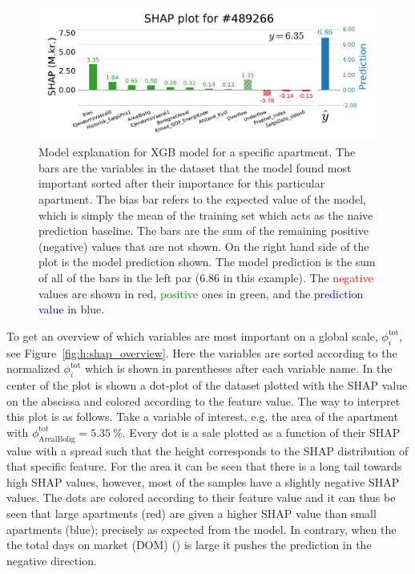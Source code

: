 \begin{figure}[ht!]
  \centerfloat
  \includegraphics[width=0.99\textwidth, trim=15 15 10 40, clip]{figures/housing/Ejerlejlighed_v19_cut_all_Ncols_all_SHAP_fig_loc=489266.pdf}
  \caption[SHAP Prediction Explanation for apartment]
          {Model explanation for XGB model for a specific apartment. The bars are the variables in the dataset that the model found most important sorted after their importance for this particular apartment. The bias bar refers to the expected value of the model, which is simply the mean of the training set which acts as the naive prediction baseline. The  bars are the sum of the remaining positive (negative) values that are not shown. On the right hand side of the plot is the model prediction shown. The model prediction is the sum of all of the bars in the left par (\SI{6.86}{\Mkr} in this example). The \textcolor{red}{negative} values are shown in red, \textcolor{green}{positive} ones in green, and the \textcolor{blue}{prediction value} in blue. 
          } 
  \label{fig:h:shap_single_apartment}
\end{figure}

To get an overview of which variables are most important on a global scale, $\phi_i^\mathrm{tot}$, see Figure~\ref{fig:h:shap_overview}. Here the variables are sorted according to the normalized $\phi_i^\mathrm{tot}$ which is shown in parentheses after each variable name. In the center of the plot is shown a dot-plot of the dataset plotted with the SHAP value on the abscissa and colored according to the feature value. 
The way to interpret this plot is as follows. Take a variable of interest, e.g. the area of the apartment  with $\phi_\mathrm{ArealBolig}^\mathrm{tot}=\SI{5.35}{\percent}$. Every dot is a sale plotted as a function of their SHAP value with a spread such that the height corresponds to the SHAP distribution of that specific feature. For the area it can be seen that there is a long tail towards high SHAP values, however, most of the samples have a slightly negative SHAP values. The dots are colored according to their feature value and it can thus be seen that large apartments (red) are given a higher SHAP value than small apartments (blue); precisely as expected from the model. In contrary, when the the total days on market (DOM) () is large it pushes the prediction in the negative direction. 

